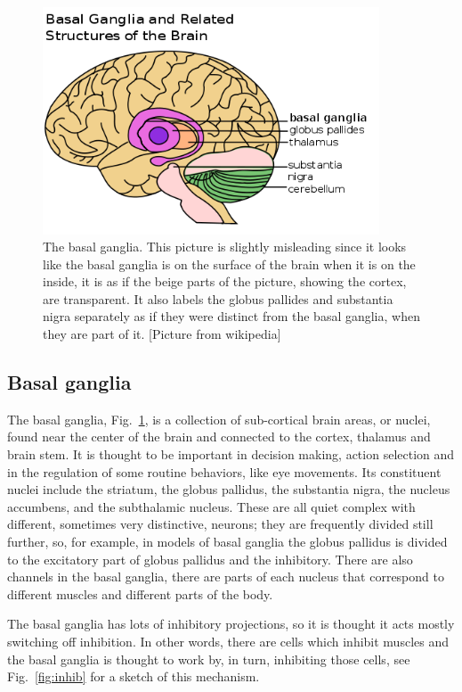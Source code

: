 \documentclass[11pt,a4paper]{scrartcl}
\begin{document}
\begin{figure}
\begin{center}
\includegraphics[width=10cm]{basal_ganglia_wikipedia.png}%
\end{center}
\caption{The basal ganglia. This picture is slightly misleading since it looks like the basal ganglia is on the surface of the brain when it is on the inside, it is as if the beige parts of the picture, showing the cortex, are transparent. It also labels the globus pallides and substantia nigra separately as if they were distinct from the basal ganglia, when they are part of it. [Picture from wikipedia]\label{fig:basal_ganglia}}
\end{figure}

\subsection*{Basal ganglia}

The basal ganglia, Fig.~\ref{fig:basal_ganglia}, is a collection of
sub-cortical brain areas, or nuclei, found near the center of the
brain and connected to the cortex, thalamus and brain stem. It is
thought to be important in decision making, action selection and in
the regulation of some routine behaviors, like eye movements. Its
constituent nuclei include the striatum, the globus pallidus, the
substantia nigra, the nucleus accumbens, and the subthalamic
nucleus. These are all quiet complex with different, sometimes very
distinctive, neurons; they are frequently divided still further, so,
for example, in models of basal ganglia the globus pallidus is divided
to the excitatory part of globus pallidus and the inhibitory. There
are also channels in the basal ganglia, there are parts of each
nucleus that correspond to different muscles and different parts of
the body.

The basal ganglia has lots of inhibitory projections, so it is thought
it acts mostly switching off inhibition. In other words, there are
cells which inhibit muscles and the basal ganglia is thought to work
by, in turn, inhibiting those cells, see Fig.~\ref{fig:inhib} for a
sketch of this mechanism.
\end{document}
